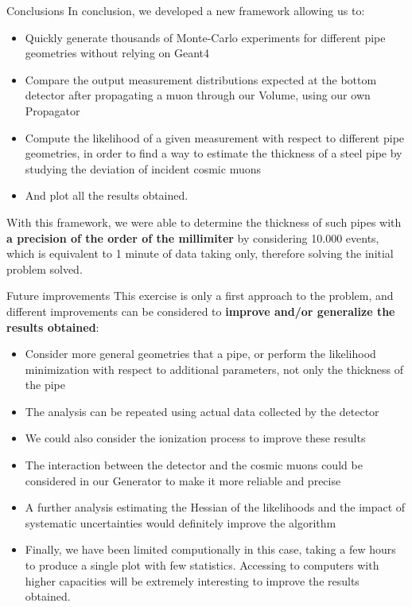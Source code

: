 \documentclass[8 pt]{beamer}
\begin{document}
\begin{frame}{Conclusions}
\justifying
In conclusion, we developed a new framework allowing us to:
\begin{itemize}
\justifying
\item Quickly generate thousands of Monte-Carlo experiments for different pipe geometries without relying on Geant4
\item Compare the output measurement distributions expected at the bottom detector after propagating a muon through our Volume, using 	our own Propagator
\item Compute the likelihood of a given measurement with respect to different pipe geometries, in order to find a way to estimate the thickness of a steel pipe by studying the deviation of incident cosmic muons
\item And plot all the results obtained.
\end{itemize} \vfill

With this framework, we were able to determine the thickness of such pipes with \textbf{a precision of the order of the millimiter} by considering 10.000 events, which is equivalent to 1 minute of data taking only, therefore solving the initial problem solved. \vfill
\end{frame}

\begin{frame}{Future improvements}
\justifying
This exercise is only a first approach to the problem, and different improvements can be considered to \textbf{improve and/or generalize the results obtained}:
\begin{itemize}
\justifying
\item Consider more general geometries that a pipe, or perform the likelihood minimization with respect to additional parameters, not only the thickness of the pipe
\item The analysis can be repeated using actual data collected by the detector
\item We could also consider the ionization process to improve these results
\item The interaction between the detector and the cosmic muons could be considered in our Generator to make it more reliable and precise
\item A further analysis estimating the Hessian of the likelihoods and the impact of systematic uncertainties would definitely improve the algorithm
\item Finally, we have been limited computionally in this case, taking a few hours to produce a single plot with few statistics. Accessing to computers with higher capacities will be extremely interesting to improve the results obtained.
\end{itemize}
\end{frame}
\end{document}
